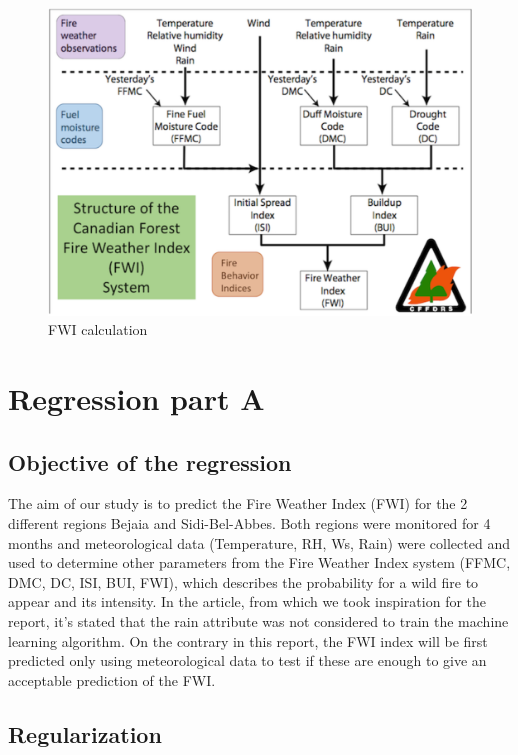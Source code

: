 \documentclass[10pt]{article}
\numberwithin{equation}{section}
\numberwithin{figure}{section}
\numberwithin{table}{section}
\begin{document}
\begin{figure}[H]
    \centering
    \includegraphics[scale = 0.5]{Figures/Fire_weather_index.png}
    \caption{FWI calculation}
    \label{FWI}
\end{figure}


\section{Regression part A}
\subsection{Objective of the regression}
The aim of our study is to predict the Fire Weather Index (FWI) for the 2 different regions Bejaia and Sidi-Bel-Abbes.  Both regions were monitored for 4 months and meteorological data (Temperature, RH, Ws, Rain) were collected and used to determine other parameters from the Fire Weather Index system (FFMC, DMC, DC, ISI, BUI, FWI), which describes the probability for a wild fire to appear and its intensity.
In the article, from which we took inspiration for the report, it's stated that the rain attribute was not considered to train the machine learning algorithm.
On the contrary in this report, the FWI index will be first predicted only using meteorological data to test if these are enough to give an acceptable prediction of the FWI.


\subsection{Regularization}
\end{document}
